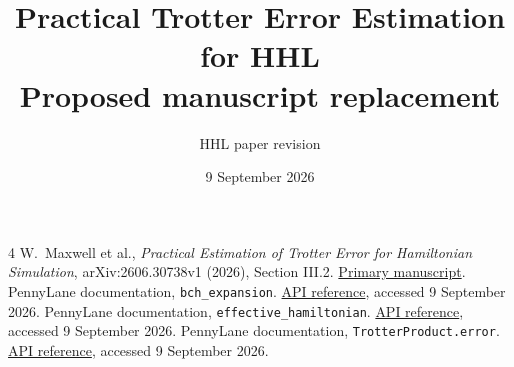 \documentclass[11pt,a4paper]{article}
\title{Practical Trotter Error Estimation for HHL\\\large Proposed manuscript replacement}
\author{HHL paper revision}\date{9 September 2026}
\begin{document}
\maketitle

\begin{thebibliography}{4}
 W.~Maxwell et al., \emph{Practical Estimation of Trotter Error for Hamiltonian Simulation}, arXiv:2606.30738v1 (2026), Section III.2. \href{https://arxiv.org/html/2606.30738v1}{Primary manuscript}.
 PennyLane documentation, \texttt{bch\_expansion}. \href{https://docs.pennylane.ai/en/stable/code/api/api/pennylane.labs.trotter_error.bch_expansion.html}{API reference}, accessed 9 September 2026.
 PennyLane documentation, \texttt{effective\_hamiltonian}. \href{https://docs.pennylane.ai/en/stable/code/api/api/pennylane.labs.trotter_error.effective_hamiltonian.html}{API reference}, accessed 9 September 2026.
 PennyLane documentation, \texttt{TrotterProduct.error}. \href{https://docs.pennylane.ai/en/stable/code/api/pennylane.TrotterProduct.html}{API reference}, accessed 9 September 2026.
\end{thebibliography}
\end{document}
